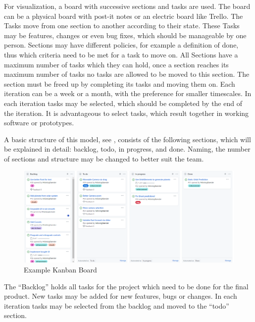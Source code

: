 \documentclass[runningheads]{llncs}
\begin{document}
For visualization, a board with successive sections and tasks are used. The board can be a physical board with post-it notes or an electric board like Trello. 
The Tasks move from one section to another according to their state. These Tasks may be features, changes or even bug fixes, which should be 
manageable by one person. Sections may have different policies, for example a definition of done, thus which criteria need to be met for a task to move on. All Sections
have a maximum number of tasks which they can hold, once a section reaches its maximum number of tasks no tasks are allowed to be moved to 
this section. The section must be freed up by completing its tasks and moving them on.
Each iteration can be a week or a month, with the preference for smaller timescales. In each iteration tasks may be selected, 
which should be completed by the end of the iteration. It is advantageous to select tasks, which result together in working software or prototypes.

A basic structure of this model, see , consists of the following sections, which will be explained in detail: 
backlog, todo, in progress, and done. Naming, the number of sections and structure may be changed to better suit the team.

\begin{figure}[!htb]
  \centering
  \begin{minipage}{1\textwidth}
      \centering
      \includegraphics[width=1\textwidth]{Kanban.PNG}
      \caption{Example Kanban Board \cite{ref_planeterKanban}}
      \label{fig:kanban}
  \end{minipage}%
\end{figure}

The “Backlog” holds all tasks for the project which need to be done for the final product. New tasks may be added for new features, 
bugs or changes. In each iteration tasks may be selected from the backlog and moved to the “todo” section.
\end{document}
